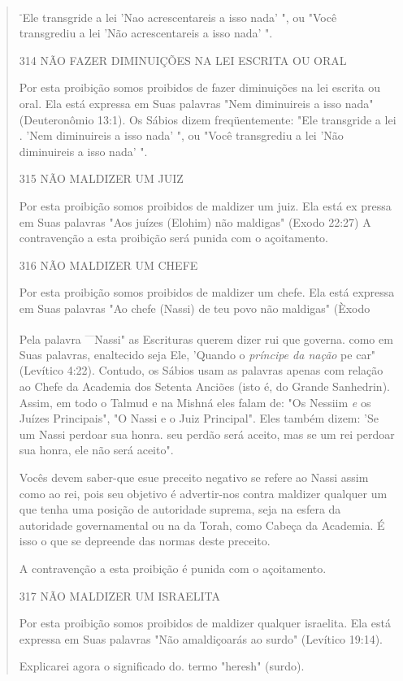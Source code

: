\begin{quote}
\textsuperscript{-}Ele transgride a lei 'Nao acrescentareis a isso nada'
", ou "Você transgrediu a lei 'Não acrescentareis a isso nada' ".

314 NÃO FAZER DIMINUIÇÕES NA LEI ESCRITA OU ORAL

Por esta proibição somos proibidos de fazer diminuições na lei es­crita
ou oral. Ela está expressa em Suas palavras "Nem diminuireis a isso
nada" (Deuteronômio 13:1). Os Sábios dizem freqüentemente: "Ele
transgride a lei . 'Nem diminuireis a isso nada' ", ou "Você transgrediu
a lei 'Não diminuireis a isso nada' ".

315 NÃO MALDIZER UM JUIZ

Por esta proibição somos proibidos de maldizer um juiz. Ela está ex
pressa em Suas palavras "Aos juízes (Elohim) não maldigas" (Exodo 22:27)
A contravenção a esta proibição será punida com o açoitamento.

316 NÃO MALDIZER UM CHEFE

Por esta proibição somos proibidos de maldizer um chefe. Ela está
expressa em Suas palavras "Ao chefe (Nassi) de teu povo não maldigas"
(Èxodo

Pela palavra \textsuperscript{---}Nassi" as Escrituras querem dizer rui
que governa. como em Suas palavras, enaltecido seja Ele, 'Quando o
\emph{príncipe da nação} pe car" (Levítico 4:22). Contudo, os Sábios
usam as palavras apenas com relação ao Chefe da Academia dos Setenta
Anciões (isto é, do Grande Sanhedrin). As­sim, em todo o Talmud e na
Mishná eles falam de: "Os Nessiim \emph{e} os Juízes Prin­cipais", "O
Nassi e o Juiz Principal". Eles também dizem: 'Se um Nassi per­doar sua
honra. seu perdão será aceito, mas se um rei perdoar sua honra, ele não
será aceito".

Vocês devem saber-que esue preceito negativo se refere ao Nassi as­sim
como ao rei, pois seu objetivo é advertir-nos contra maldizer qualquer
um que tenha uma posição de autoridade suprema, seja na esfera da
autoridade go­vernamental ou na da Torah, como Cabeça da Academia. É
isso o que se de­preende das normas deste preceito.

A contravenção a esta proibição é punida com o açoitamento.

317 NÃO MALDIZER UM ISRAELITA

Por esta proibição somos proibidos de maldizer qualquer israelita. Ela
está expressa em Suas palavras "Não amaldiçoarás ao surdo" (Levítico
19:14).

Explicarei agora o significado do. termo "heresh" (surdo).


\end{quote}

